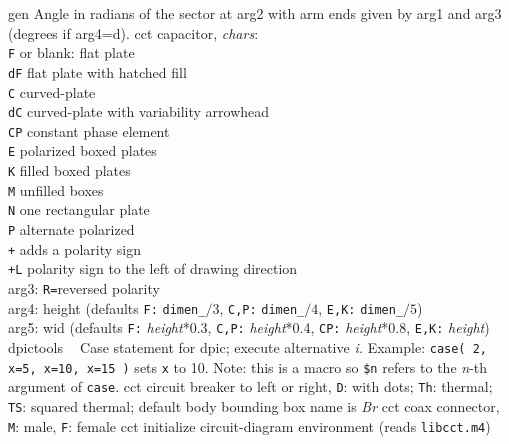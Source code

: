   {gen}%
  {Angle in radians of the sector at arg2 with arm ends given
   by arg1 and arg3 (degrees if arg4=d).}%
%
  {cct}%
  {capacitor, {\sl chars}:\\
    {\tt F} or blank: flat plate\\
    {\tt dF} flat plate with hatched fill\\
    {\tt C} curved-plate\\
    {\tt dC} curved-plate with variability arrowhead\\
    {\tt CP} constant phase element\\
    {\tt E} polarized boxed plates\\
    {\tt K} filled boxed plates\\
    {\tt M} unfilled boxes\\
    {\tt N} one rectangular plate\\
    {\tt P} alternate polarized\\
    {\tt +} adds a polarity sign\\
    {\tt +L} polarity sign to the left of drawing direction\\
    arg3:  {\tt R=}reversed polarity\\
    arg4: height (defaults {\tt F:} {\tt dimen\_}$/3$,
      {\tt C,P:} {\tt dimen\_}$/4$,
      {\tt E,K:} {\tt dimen\_}$/5$)\\
    arg5: wid (defaults {\tt F:} {\sl height}*0.3,
      {\tt C,P:} {\sl height}*0.4,
      {\tt CP:} {\sl height}*0.8,
      {\tt E,K:} {\sl height})
    }%
%
  {dpictools}%
  {$\;\;$ Case statement for dpic; execute alternative {\sl i.}%
   Example: {\tt case( 2, x=5, x=10, x=15 )} sets {\tt x} to 10.
   Note: this is a macro so {\tt \${}n} refers to the {\sl n}-th
	 argument of {\tt case}.}%
%
  {cct}%
  {circuit breaker to left or right, {\tt D}: with dots; {\tt Th}: thermal;
   {\tt TS}: squared thermal; default body bounding box name is
     {\sl Br}}%
%
  {cct}%
  {coax connector, {\tt M}: male, {\tt F}: female
    }%
%
  {cct}%
  {initialize circuit-diagram environment (reads {\tt libcct.m4})}%
%
